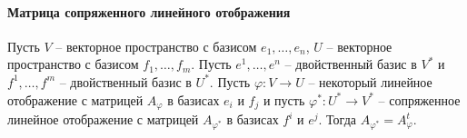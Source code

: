 \paragraph{Матрица сопряженного линейного отображения}

\begin{claim}
\label{claim::DualHomMatrix}
Пусть $V$ -- векторное пространство с базисом $e_1,\ldots,e_n$, $U$ -- векторное пространство с базисом $f_1,\ldots,f_m$.
Пусть $e^1,\ldots,e^n$ -- двойственный базис в $V^*$ и $f^1,\ldots,f^m$ -- двойственный базис в $U^*$.
Пусть $\varphi \colon V\to U$ -- некоторый линейное отображение с матрицей $A_\varphi$ в базисах $e_i$ и $f_j$ и пусть $\varphi^*\colon U^*\to V^*$ -- сопряженное линейное отображение с матрицей $A_{\varphi^*}$ в базисах $f^i$ и $e^j$.
Тогда $A_{\varphi^*} = A_{\varphi}^t$.
\end{claim}
